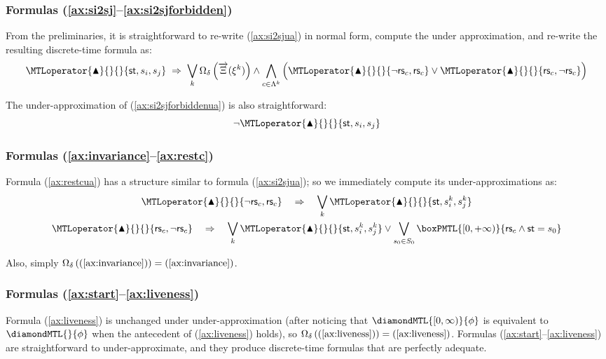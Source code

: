 \documentclass[a4paper]{article}
\newcommand{\frf}[1]{(\ref{#1})}
\newcommand{\fsrf}[2]{(\ref{#1}--\ref{#2})}
\newcommand{\underap}[1]{\Omega_{\delta}\left({#1}\right)}
\newcommand{\st}{\mathsf{st}}
\newcommand{\rest}[1]{\mathsf{rs}_{#1}}
\newcommand{\becomesOMTL}[1]{\MTLoperator{\blacktriangle}{}{}{#1}}
\newcommand{\becomesLMTL}[1]{\becomesOMTL{#1}}
\newcommand{\XiL}{\overrightarrow{\Xi}}
\theoremstyle{plain}
\theoremstyle{definition}
\begin{document}
\subsubsection{Formulas \fsrf{ax:si2sj}{ax:si2sjforbidden}}
From the preliminaries, it is straightforward to re-write \frf{ax:si2sjua} in normal form, compute the under approximation, and re-write the resulting discrete-time formula as:
\begin{multline} \label{ax:si2sj-underap}
  \becomesLMTL{\st, s_i, s_j} \;\Rightarrow\; 
     \bigvee_k  \underap{\XiL(\xi^k)} \wedge \bigwedge_{c \in \Lambda^k}
               \Big( \becomesLMTL{\neg \rest{c}, \rest{c}} \vee \becomesLMTL{\rest{c}, \neg \rest{c}} \Big)
\end{multline}

The under-ap\-prox\-i\-ma\-tion of \frf{ax:si2sjforbiddenua} is also straightforward:
\begin{equation} \label{ax:si2sjforbidden-underap}
  \neg \becomesLMTL{\st, s_i, s_j}
\end{equation}



\subsubsection{Formulas \fsrf{ax:invariance}{ax:restc}}
Formula \frf{ax:restcua} has a structure similar to formula \frf{ax:si2sjua}; so we immediately compute its under-ap\-prox\-i\-ma\-tions as:
\begin{gather} 
  \becomesLMTL{\neg \rest{c}, \rest{c}} \quad \Rightarrow \quad 
       \bigvee_k \becomesLMTL{\st, s_i^k, s_j^k} \nonumber \\
  \becomesLMTL{\rest{c}, \neg \rest{c}} \quad \Rightarrow \quad 
       \bigvee_k \becomesLMTL{\st, s_i^k, s_j^k}  \vee \bigvee_{s_0 \in S_0} \boxPMTL{[0, +\infty)}{\rest{c} \wedge \st = s_0} \label{ax:restc-underap}
\end{gather}

Also, simply $\underap{\frf{ax:invariance}} = \frf{ax:invariance}$.



\subsubsection{Formulas \fsrf{ax:start}{ax:liveness}}
Formula \frf{ax:liveness} is unchanged under under-approximation (after noticing that \linebreak $\diamondMTL{[0, \infty)}{\phi}$ is equivalent to $\diamondMTL{}{\phi}$ when the antecedent of \frf{ax:liveness} holds), so $\underap{\frf{ax:liveness}} = \frf{ax:liveness}$.
Formulas \fsrf{ax:start}{ax:liveness} are straightforward to under-approximate, and they produce discrete-time formulas that are perfectly adequate.
\end{document}
